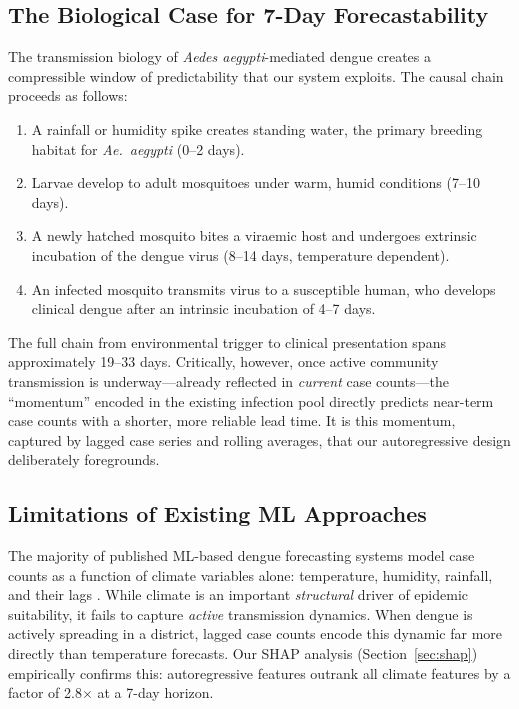 \documentclass[conference]{IEEEtran}
\begin{document}
\subsection{The Biological Case for 7-Day Forecastability}

The transmission biology of \textit{Aedes aegypti}-mediated dengue
creates a compressible window of predictability that our system
exploits. The causal chain proceeds as follows:

\begin{enumerate}
  \item A rainfall or humidity spike creates standing water, the
        primary breeding habitat for \textit{Ae.\ aegypti} (0--2 days).
  \item Larvae develop to adult mosquitoes under warm, humid
        conditions (7--10 days).
  \item A newly hatched mosquito bites a viraemic host and undergoes
        extrinsic incubation of the dengue virus (8--14 days, temperature
        dependent).
  \item An infected mosquito transmits virus to a susceptible human,
        who develops clinical dengue after an intrinsic incubation of
        4--7 days.
\end{enumerate}

The full chain from environmental trigger to clinical presentation
spans approximately 19--33 days. Critically, however, once active
community transmission is underway---already reflected in
\emph{current} case counts---the ``momentum'' encoded in the
existing infection pool directly predicts near-term case counts
with a shorter, more reliable lead time. It is this momentum,
captured by lagged case series and rolling averages, that our
autoregressive design deliberately foregrounds.

\subsection{Limitations of Existing ML Approaches}

The majority of published ML-based dengue forecasting systems model
case counts as a function of climate variables alone: temperature,
humidity, rainfall, and their lags \cite{kakarla2023, sebastianelli2024,
iitm2025}. While climate is an important \emph{structural} driver of
epidemic suitability, it fails to capture \emph{active} transmission
dynamics. When dengue is actively spreading in a district, lagged
case counts encode this dynamic far more directly than temperature
forecasts. Our SHAP analysis (Section~\ref{sec:shap}) empirically
confirms this: autoregressive features outrank all climate features
by a factor of 2.8$\times$ at a 7-day horizon.
\end{document}
